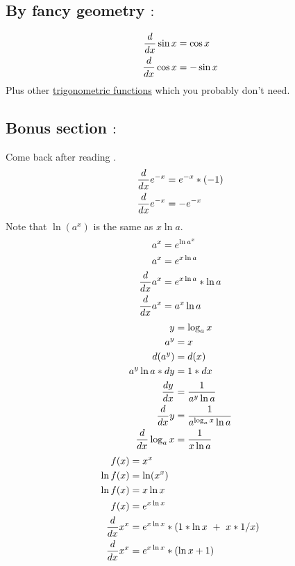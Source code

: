 \documentclass[a4paper,14pt,twoside]{book}
\begin{document}
{\subsection{By fancy geometry $:$}
\begin{align*}
	\frac{d}{dx} \sin{x} & = \cos{x}  \\
	\frac{d}{dx} \cos{x} & = -\sin{x}
\end{align*}
Plus other \href{https://www.priklady.eu/cs/matematika/derivace/derivace-funkce.alej}{trigonometric functions} which you probably don't need.
\subsection{Bonus section $:$}
Come back after reading .
\begin{align*}
	\frac{d}{dx} e^{-x} & = e^{-x} * (-1) \\
	\frac{d}{dx} e^{-x} & = -e^{-x}       \\
\end{align*}
Note that $\ln (a^x)$ is the same as $x \ln a$.
\begin{align*}
	a^x    & = e^{\ln a^x}         \\
	a^x    & = e^{x \ln a}         \\
	\frac{d}{dx} a^x & = e^{x \ln a} * \ln a \\
	\frac{d}{dx} a^x & = a^x \ln a           \\
\end{align*}
\pagebreak
\begin{align*}
	y              & = \log_a{x}                  \\
	a^y            & = x                          \\
	d(a^y)         & = d(x)                       \\
	a^y \ln a * dy & = 1*dx                       \\
	\frac{d y}{d x}      & = \frac{1}{a^y \ln a}           \\
	\frac{d}{dx} y           & = \frac{1}{a^{\log_a{x}} \ln a} \\
	\frac{d}{dx} \log_a{x}   & = \frac{1}{x \ln a}
\end{align*}
\begin{align*}
	f(x)     & = x^x                               \\
	\ln f(x) & = \ln (x^x)                         \\
	\ln f(x) & = x \ln x                           \\
	f(x)     & = e^{x \ln x}                       \\
	\frac{d}{dx} x^x   & = e^{x \ln x} * (1*\ln x\ +\ x*1/x) \\
	\frac{d}{dx} x^x   & = e^{x \ln x} * (\ln x + 1)         \\
\end{align*}
\pagebreak
}
\end{document}
